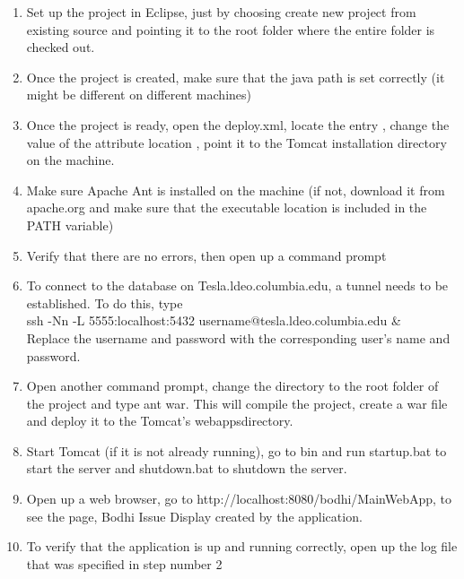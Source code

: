 \documentclass[12pt]{article}
\begin{document}
\begin{enumerate}
\item Set up the project in Eclipse, just by choosing create new project from existing source and pointing it to the root folder where the entire folder is checked out.

\item Once the project is created, make sure that the java path is set correctly (it might be different on different machines)

\item Once the project is ready, open the deploy.xml, locate the entry , change the value of the attribute \textgravedbl location \textasciidieresis, point it to the Tomcat installation directory on the machine.

\item Make sure Apache Ant is installed on the machine (if not, download it from apache.org and make sure that the executable location is included in the PATH variable)

\item Verify that there are no errors, then open up a command prompt

\item To connect to the database on Tesla.ldeo.columbia.edu, a tunnel needs to be established. To do this, type \\
ssh -Nn -L 5555:localhost:5432 username@tesla.ldeo.columbia.edu \& \\
Replace the username and password with the corresponding user's name and password.

\item Open another command prompt, change the directory to the root folder of  the project and type ant war. This will compile the project, create a war file and deploy it to the Tomcat's \textgravedbl webapps\textasciidieresis directory.

\item Start Tomcat (if it is not already running), go to bin and run startup.bat to start the server and shutdown.bat to shutdown the server.

\item Open up a web browser, go to http://localhost:8080/bodhi/MainWebApp, to see the page, Bodhi Issue Display created by the application.

\item To verify that the application is up and running correctly, open up the log file that was specified in step number 2
\end{enumerate}
\end{document}
